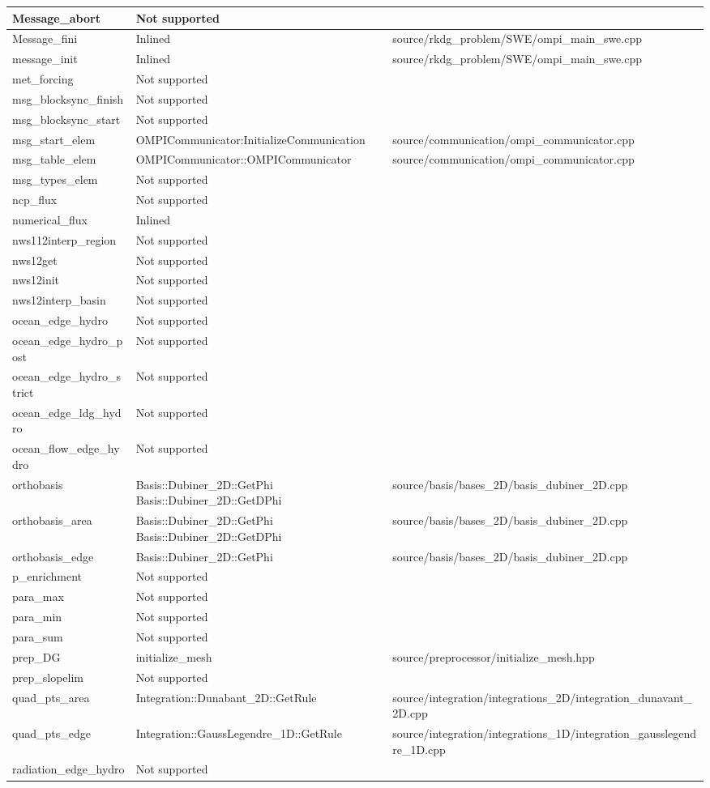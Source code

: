 {\begin{longtable}{ l | p{55mm} | p{86mm} }
\tabularnewline \hline
Message\_abort & Not supported	
\tabularnewline \hline
Message\_fini & Inlined & source/rkdg_problem/SWE/ompi\_main\_swe.cpp
\tabularnewline \hline
message\_init & Inlined & source/rkdg_problem/SWE/ompi\_main\_swe.cpp
\tabularnewline \hline
met\_forcing & Not supported	&
\tabularnewline \hline
msg\_blocksync\_finish & Not supported &	
\tabularnewline \hline
msg\_blocksync\_start & Not supported &
\tabularnewline \hline
msg\_start\_elem & OMPICommunicator:InitializeCommunication & source/communication/ompi\_communicator.cpp
\tabularnewline \hline
msg\_table\_elem & OMPICommunicator::OMPICommunicator & source/communication/ompi\_communicator.cpp
\tabularnewline \hline
msg\_types\_elem & Not supported &	
\tabularnewline \hline
ncp\_flux & Not supported &
\tabularnewline \hline
numerical\_flux & Inlined &	
\tabularnewline \hline
nws112interp\_region & Not supported	&
\tabularnewline \hline
nws12get & Not supported &
\tabularnewline \hline
nws12init & Not supported &
\tabularnewline \hline
nws12interp\_basin & Not supported &
\tabularnewline \hline
ocean\_edge\_hydro & Not supported &
\tabularnewline \hline
ocean\_edge\_hydro\_post & Not supported &
\tabularnewline \hline
ocean\_edge\_hydro\_strict	& Not supported &	
\tabularnewline \hline
ocean\_edge\_ldg\_hydro & Not supported &
\tabularnewline \hline
ocean\_flow\_edge\_hydro & Not supported &	
\tabularnewline \hline
orthobasis & Basis::Dubiner\_2D::GetPhi \newline Basis::Dubiner\_2D::GetDPhi &	source/basis/bases\_2D/basis\_dubiner\_2D.cpp
\tabularnewline \hline
orthobasis\_area & Basis::Dubiner\_2D::GetPhi \newline Basis::Dubiner\_2D::GetDPhi & source/basis/bases\_2D/basis\_dubiner\_2D.cpp
\tabularnewline \hline
orthobasis\_edge	& Basis::Dubiner\_2D::GetPhi & source/basis/bases\_2D/basis\_dubiner\_2D.cpp
\tabularnewline \hline
p\_enrichment & Not supported &
\tabularnewline \hline
para\_max & Not supported &	
\tabularnewline \hline
para\_min & Not supported &
\tabularnewline \hline
para\_sum & Not supported &	
\tabularnewline \hline
prep\_DG	& initialize\_mesh & source/preprocessor/initialize\_mesh.hpp
\tabularnewline \hline
prep\_slopelim & Not supported &	
\tabularnewline \hline
quad\_pts\_area & Integration::Dunabant\_2D::GetRule & 	source/integration/integrations\_2D/integration\_dunavant\_2D.cpp
\tabularnewline \hline
quad\_pts\_edge & Integration::GaussLegendre\_1D::GetRule & source/integration/integrations\_1D/integration\_gausslegendre\_1D.cpp
\tabularnewline \hline
radiation\_edge\_hydro & Not supported &

\end{longtable}}
